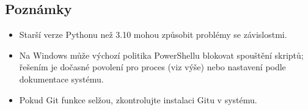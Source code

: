 \documentclass[12pt, a4paper]{article}
\begin{document}
\subsection{Poznámky}

\begin{itemize}
    \item Starší verze Pythonu než 3.10 mohou způsobit problémy se závislostmi.
    \item Na Windows může výchozí politika PowerShellu blokovat spouštění skriptů; řešením je dočasné povolení pro proces (viz výše) nebo nastavení podle dokumentace systému.
    \item Pokud Git funkce selžou, zkontrolujte instalaci Gitu v systému.
\end{itemize}
\end{document}
